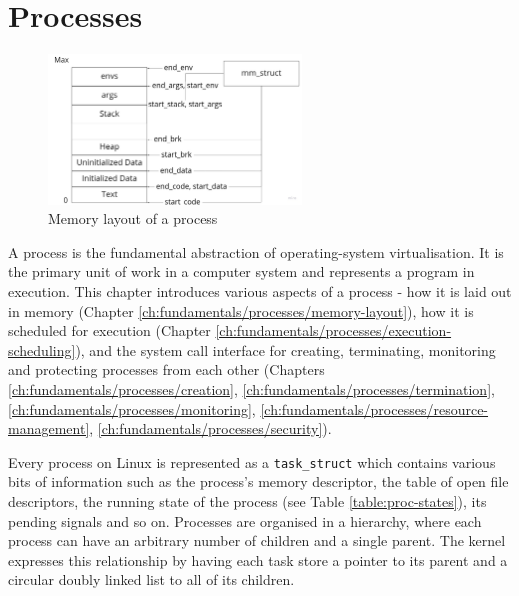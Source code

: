 \section{Processes}
\begin{figure}[H]
    \centering
    \includegraphics[width=0.6\textwidth]{images/fundamentals/proc-mem-layout.jpg}
    \caption{Memory layout of a process \cite{10.5555/2490781}}
    \label{images:fundamentals/proc-mem-layout}
\end{figure}

A process is the fundamental abstraction of operating-system virtualisation.  
It is the primary unit of work in a computer system and represents a program in execution.
This chapter introduces various aspects of a process - how it is laid out in memory 
(Chapter \ref{ch:fundamentals/processes/memory-layout}), how it is scheduled for execution 
(Chapter \ref{ch:fundamentals/processes/execution-scheduling}), and the system call interface for 
creating, terminating, monitoring and protecting processes from each other 
(Chapters \ref{ch:fundamentals/processes/creation}, \ref{ch:fundamentals/processes/termination},
\ref{ch:fundamentals/processes/monitoring}, \ref{ch:fundamentals/processes/resource-management}, 
\ref{ch:fundamentals/processes/security}).

Every process on Linux is represented as a \verb|task_struct| \cite{include/linux/sched.h} 
which contains various bits of information such as the process's memory descriptor, the table of 
open file descriptors, the running state of the process (see Table \ref{table:proc-states}), 
its pending signals and so on.
Processes are organised in a hierarchy, where each process can have an arbitrary number of children
and a single parent. The kernel expresses this relationship by having each task store a pointer 
to its parent and a circular doubly linked list to all of its children. 

